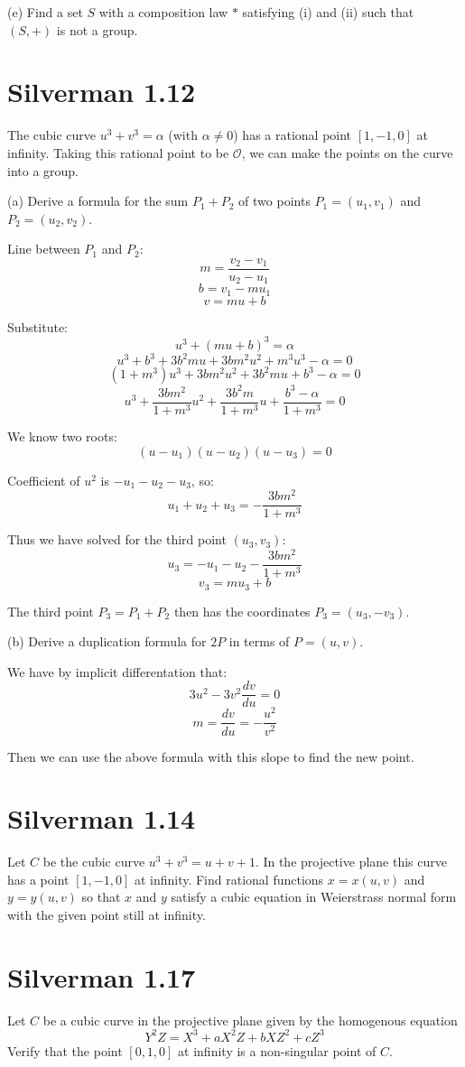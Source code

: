 \documentclass{article}
\begin{document}
(e) Find a set $S$ with a composition law $*$ satisfying (i) and (ii) such that $(S,+)$ is not a group.

\section{Silverman 1.12}
The cubic curve $u^3 + v^3 = \alpha$ (with $\alpha \neq 0$) has a rational point $[1,-1,0]$ at infinity. Taking this rational point to be $\mathcal{O}$, we can make the points on the curve into a group.

(a) Derive a formula for the sum $P_1 + P_2$ of two points $P_1 = (u_1, v_1)$ and $P_2 = (u_2, v_2)$.

Line between $P_1$ and $P_2$:
$$m = \frac{v_2 - v_1}{u_2 - u_1}$$
$$b = v_1 - mu_1$$
$$v = mu + b$$

Substitute:
$$u^3 + (mu + b)^3 = \alpha$$
$$u^3 + b^3 + 3b^2mu + 3bm^2u^2 + m^3u^3 - \alpha = 0$$
$$(1+m^3) u^3 + 3bm^2 u^2 + 3b^2m u + b^3 - \alpha = 0$$
$$u^3 + \frac{3bm^2}{1+m^3}u^2 + \frac{3b^2m}{1+m^3}u + \frac{b^3-\alpha}{1+m^3} = 0$$

We know two roots:
$$(u-u_1)(u-u_2)(u-u_3) = 0$$

Coefficient of $u^2$ is $-u_1-u_2-u_3$, so:
$$u_1 + u_2 + u_3 = -\frac{3bm^2}{1+m^3}$$

Thus we have solved for the third point $(u_3,v_3)$:
$$u_3 = - u_1 - u_2 - \frac{3bm^2}{1+m^3}$$
$$v_3 = mu_3 + b$$

The third point $P_3 = P_1 + P_2$ then has the coordinates $P_3 = (u_3, -v_3)$.

(b) Derive a duplication formula for $2P$ in terms of $P = (u,v)$.

We have by implicit differentation that:
$$3u^2 - 3v^2 \frac{dv}{du} = 0$$
$$m = \frac{dv}{du} = -\frac{u^2}{v^2}$$

Then we can use the above formula with this slope to find the new point.

\section{Silverman 1.14}
Let $C$ be the cubic curve $u^3 + v^3 = u+v+1$. In the projective plane this curve has a point $[1,-1,0]$ at infinity. Find rational functions $x = x(u,v)$ and $y=y(u,v)$ so that $x$ and $y$ satisfy a cubic equation in Weierstrass normal form with the given point still at infinity.

\section{Silverman 1.17}
Let $C$ be a cubic curve in the projective plane given by the homogenous equation 
$$Y^2 Z = X^3 + aX^2 Z + bXZ^2 + cZ^3$$
Verify that the point $[0,1,0]$ at infinity is a non-singular point of $C$.
\end{document}
